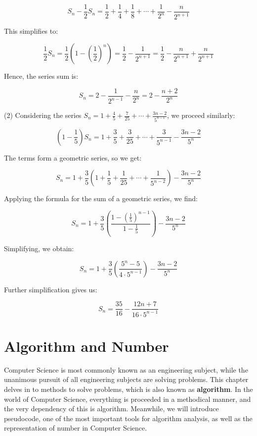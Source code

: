 \documentclass[
	12pt, %
	fleqn, %
	a4paper, %
]{LegrandOrangeBook}
\begin{document}
\[
S_n - \frac{1}{2}S_n = \frac{1}{2} + \frac{1}{4} + \frac{1}{8} + \cdots + \frac{1}{2^n} - \frac{n}{2^{n+1}}
\]

This simplifies to:

\[
\frac{1}{2}S_n = \frac{1}{2} \left(1 - \left(\frac{1}{2}\right)^n\right) = \frac{1}{2} - \frac{1}{2^{n+1}} = \frac{1}{2} - \frac{n}{2^{n+1}} + \frac{n}{2^{n+1}}
\]

Hence, the series sum is:

\[
S_n = 2 - \frac{1}{2^{n-1}} - \frac{n}{2^n} = 2 - \frac{n+2}{2^n}
\]

(2) Considering the series \( S_n = 1 + \frac{4}{5} + \frac{7}{25} + \cdots + \frac{3n-2}{5^{n-1}} \), we proceed similarly:

\[
\left(1 - \frac{1}{5}\right)S_n = 1 + \frac{3}{5} + \frac{3}{25} + \cdots + \frac{3}{5^{n-1}} - \frac{3n-2}{5^n}
\]

The terms form a geometric series, so we get:

\[
S_n = 1 + \frac{3}{5} \left(1 + \frac{1}{5} + \frac{1}{25} + \cdots + \frac{1}{5^{n-2}}\right) - \frac{3n-2}{5^n}
\]

Applying the formula for the sum of a geometric series, we find:

\[
S_n = 1 + \frac{3}{5} \left(\frac{1 - \left(\frac{1}{5}\right)^{n-1}}{1 - \frac{1}{5}}\right) - \frac{3n-2}{5^n}
\]

Simplifying, we obtain:

\[
S_n = 1 + \frac{3}{5} \left(\frac{5^n - 5}{4 \cdot 5^{n-1}}\right) - \frac{3n-2}{5^n}
\]

Further simplification gives us:

\[
S_n = \frac{35}{16} - \frac{12n+7}{16 \cdot 5^{n-1}}
\]

\chapterspaceabove{5.75cm} %
\chapterspacebelow{10cm} %
\chapter{Algorithm and Number}

Computer Science is most commonly known as an engineering subject, while the unanimous pursuit of all engineering subjects are solving problems. This chapter delves in to methods to solve problems, which is also known as \textbf{algorithm}. In the world of Computer Science, everything is proceeded in a methodical manner, and the very dependency of this is algorithm. Meanwhile, we will introduce pseudocode, one of the most important tools for algorithm analysis, as well as the representation of number in Computer Science.
\end{document}
